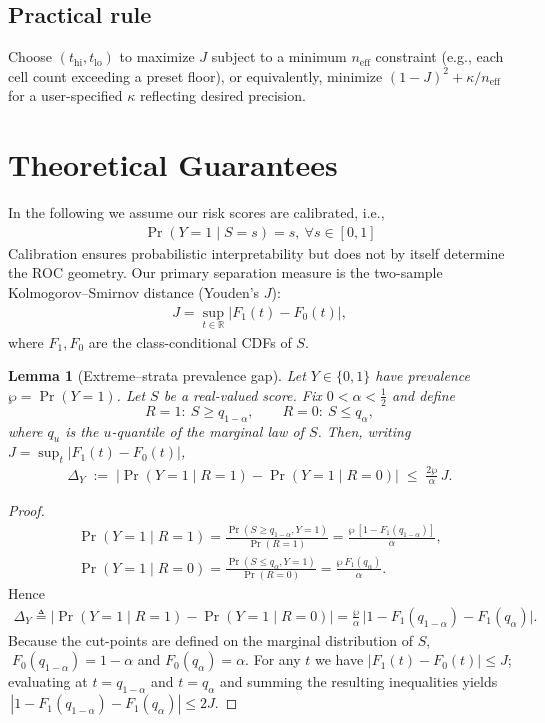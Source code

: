 \documentclass[pdflatex,sn-mathphys-num]{sn-jnl}%
\def\EQSP{3pt}
\newcommand{\mltlne}[2][\EQSP]{\begingroup\setlength\abovedisplayskip{#1}\setlength\belowdisplayskip{#1}\begin{equation}\begin{multlined} #2 \end{multlined}\end{equation}\endgroup\noindent}
\newcommand{\cgather}[2][\EQSP]{\begingroup\setlength\abovedisplayskip{#1}\setlength\belowdisplayskip{#1}\begin{gather} #2 \end{gather}\endgroup\noindent}
\theoremstyle{thmstyleone}%
\newtheorem{lemma}[theorem]{Lemma} %
\theoremstyle{thmstyletwo}%
\theoremstyle{thmstylethree}%
\begin{document}
\subsection{Practical rule}
Choose $(t_{\mathrm{hi}},t_{\mathrm{lo}})$ to maximize $J$ subject to a minimum $n_{\text{eff}}$ constraint
(e.g., each cell count exceeding a preset floor), or equivalently, minimize
$(1-J)^2 + \kappa/n_{\text{eff}}$ for a user-specified $\kappa$ reflecting desired precision.

\section{Theoretical Guarantees}
In the following we assume our risk scores are calibrated,
i.e.,
\cgather{\label{eqcalib}
  \Pr(Y=1\mid S=s)=s,\ \forall s\in[0,1]}
Calibration ensures probabilistic interpretability but does not by itself determine
the ROC geometry. Our primary separation measure is the two-sample
Kolmogorov–Smirnov distance (Youden’s \(J\)):
\cgather{
J=\sup_{t\in\mathbb{R}}\big|F_1(t)-F_0(t)\big|,
}
where \(F_1,F_0\) are the class-conditional CDFs of \(S\).
%
\begin{lemma}[Extreme–strata prevalence gap]\label{lem:prevalence-gap}
Let \(Y\in\{0,1\}\) have prevalence \(\wp=\Pr(Y=1)\).
Let \(S\) be a real-valued score. Fix \(0<\alpha<\tfrac12\) and define
\[
R=1:\ S\ge q_{1-\alpha},\qquad R=0:\ S\le q_{\alpha},
\]
where \(q_u\) is the \(u\)-quantile of the \emph{marginal} law of \(S\).
Then, writing \(J=\sup_t|F_1(t)-F_0(t)|\),
\cgather{
\Delta_Y\;:=\;\big|\Pr(Y=1\mid R=1)-\Pr(Y=1\mid R=0)\big|
\;\le\;\frac{2\wp}{\alpha}\,J.
\tag{KS bound}
}
\end{lemma}
%
\begin{proof}
\cgather{
\Pr(Y=1\mid R=1)
  =\frac{\Pr(S\ge q_{1-\alpha},Y=1)}{\Pr(R=1)}
  =\frac{\wp\,[1-F_1(q_{1-\alpha})]}{\alpha},\\[6pt]
\Pr(Y=1\mid R=0)
  =\frac{\Pr(S\le q_{\alpha},Y=1)}{\Pr(R=0)}
  =\frac{\wp\,F_1(q_{\alpha})}{\alpha}.
}
Hence
\mltlne{
\Delta_Y
\triangleq\bigl|\Pr(Y=1\mid R=1)-\Pr(Y=1\mid R=0)\bigr| =\frac{\wp}{\alpha}\,
    \bigl|1-F_1(q_{1-\alpha})-F_1(q_{\alpha})\bigr|.
}%
Because the cut-points are defined on the marginal distribution of \(S\),
\(\;F_0(q_{1-\alpha})=1-\alpha\) and \(F_0(q_{\alpha})=\alpha\).
For any \(t\) we have \(\lvert F_1(t)-F_0(t)\rvert\le J\); evaluating at
\(t=q_{1-\alpha}\) and \(t=q_{\alpha}\) and summing the resulting
inequalities yields
\(\,|1-F_1(q_{1-\alpha})-F_1(q_{\alpha})|\le2J\).
\end{proof}
\end{document}
